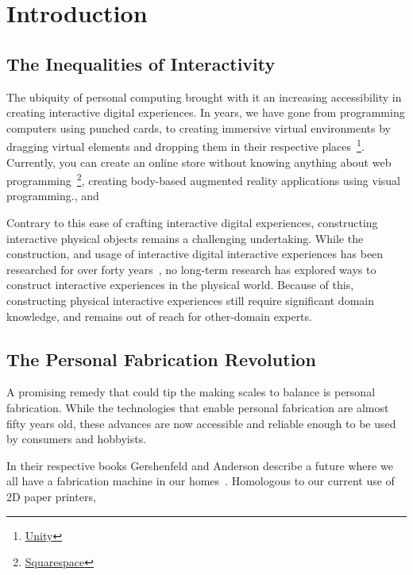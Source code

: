\chapter{Introduction}
  \section{The Inequalities of Interactivity}
    The ubiquity of personal computing brought with it an increasing
    accessibility in creating interactive digital experiences.  In 
    years, we have gone from programming computers using punched cards, to
    creating immersive virtual environments by dragging virtual elements and
    dropping them in their respective
    places~\footnote{\href{https://unity.com}{Unity}}.  Currently, you can
    create an online store without knowing anything about web
    programming~\footnote{\href{https://www.squarespace.com}{Squarespace}},
    creating body-based augmented reality applications using visual
    programming.\cite{Pohl:2020}, and 

    Contrary to this ease of crafting interactive digital experiences,
    constructing interactive physical objects remains a challenging
    undertaking. While the construction, and usage of interactive digital
    interactive experiences has been researched for over forty
    years~\cite{CHI, UIST}, no long-term research has explored ways to
    construct interactive experiences in the physical world. Because of this,
    constructing physical interactive experiences still require significant
    domain knowledge, and remains out of reach for other-domain experts.
   

  \section{The Personal Fabrication Revolution} \label{sec:fab-revolution}
    A promising remedy that could tip the making scales to balance is
    personal fabrication. While the technologies that enable personal
    fabrication  are almost fifty years old, these advances are
    now accessible and reliable enough to be used by consumers and hobbyists.

    In their respective books Gershenfeld and Anderson describe a future where
    we all have a fabrication machine in our homes~\cite{Gershenfeld:2005,
    Anderson:2012}.  Homologous to our current use of 2D paper printers,

